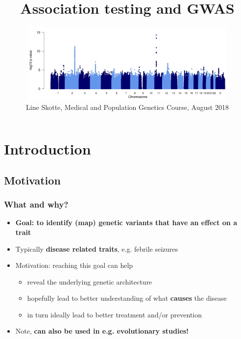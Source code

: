 \documentclass[xcolor=pdftex,dvipsnames,table,10pt]{beamer}
\date{}
\title{Association testing and GWAS}
\author[Line Skotte, Medical and Population Genetics Course, August 2018]{\includegraphics[width=0.8\textwidth]{febrile_gwas.png}\\
\vspace{0.2cm} Line Skotte, Medical and Population Genetics Course, August 2018\vspace{-1.5cm}}
\begin{document}
 

\begin{frame}[plain]
\titlepage
\end{frame}






\section{Introduction}

\subsection{Motivation}
\begin{frame}
  \frametitle{What and why?}
   \vspace{-2.00cm} 
   \small 
    \begin{itemize}\setlength{\itemindent}{-1em}
    \item \textbf{Goal: to identify (map) genetic variants that have an effect on a trait}\\
    \item Typically \textbf{disease related traits}, e.g. febrile seizures 
  \item<2-> Motivation: reaching this goal can help
  \begin{itemize}\setlength{\itemindent}{-1em}
  \item reveal the underlying genetic architecture 
  \item hopefully lead to better understanding of what \textbf{causes} the disease
  \item in turn ideally lead to better treatment and/or prevention
  \end{itemize}
  \item<3-> Note, \textbf{can also be used in e.g. evolutionary studies!}%
  \end{itemize}
\end{frame}
\end{document}
